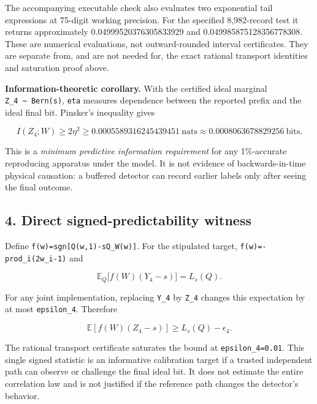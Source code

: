 \documentclass[
  10pt,
  a4paper,
]{article}
\begin{document}
The accompanying executable check also evaluates two exponential tail expressions at 75-digit working precision. For the specified 8,982-record test it returns approximately 0.04999520376305833929 and 0.049985875128356778308. These are numerical evaluations, not outward-rounded interval certificates. They are separate from, and are not needed for, the exact rational transport identities and saturation proof above.

\textbf{Information-theoretic corollary.} With the certified ideal marginal \texttt{Z\_4\ \textasciitilde{}\ Bern(s)}, \texttt{eta} measures dependence between the reported prefix and the ideal final bit. Pinsker's inequality gives

\[
 I(Z_4;W)\ge 2\eta^2\ge 0.0005589316245439451\ \text{nats}
     \approx 0.0008063678829256\ \text{bits}.
\]

This is a \emph{minimum predictive information requirement} for any 1\%-accurate reproducing apparatus under the model. It is not evidence of backwards-in-time physical causation: a buffered detector can record earlier labels only after seeing the final outcome.

\subsection{4. Direct signed-predictability witness}\label{direct-signed-predictability-witness}

Define \texttt{f(w)=sgn{[}Q(w,1)-sQ\_W(w){]}}. For the stipulated target, \texttt{f(w)=-prod\_i(2w\_i-1)} and

\[
 \mathbb E_Q\big[f(W)(Y_4-s)\big]=L_s(Q).
\]

For any joint implementation, replacing \texttt{Y\_4} by \texttt{Z\_4} changes this expectation by at most \texttt{epsilon\_4}. Therefore

\[
 \boxed{\mathbb E[f(W)(Z_4-s)]\ge L_s(Q)-\epsilon_4.}
\]

The rational transport certificate saturates the bound at \texttt{epsilon\_4=0.01}. This single signed statistic is an informative calibration target if a trusted independent path can observe or challenge the final ideal bit. It does not estimate the entire correlation law and is not justified if the reference path changes the detector's behavior.
\end{document}
